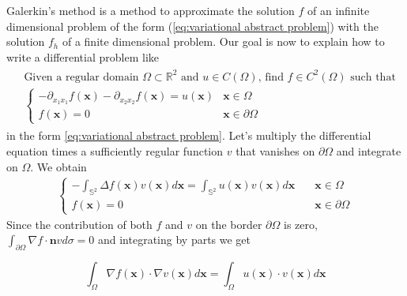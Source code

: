 Galerkin's method is a method to approximate the solution $f$ of an infinite dimensional problem of the form (\ref{eq:variational abstract problem}) with the solution $f_h$ of a finite dimensional problem. Our goal is now to explain how to write a differential problem like 
\begin{align}\label{eq:strong form}
\begin{split}
&\text{Given a regular domain }\Omega\subset\mathbb R^2\text{ and } u\in C(\Omega)\text{, find }f\in C^2(\Omega) \text{ such that}\\
&\begin{cases}
-\partial_{x_1x_1}f(\mathbf x) - \partial_{x_2x_2}f(\mathbf x) = u(\mathbf x) & \mathbf x \in \Omega\\
f(\mathbf x) =  0& \mathbf x \in \partial \Omega
\end{cases}
\end{split}
\end{align}
in the form \ref{eq:variational abstract problem}. Let's multiply the differential equation times a sufficiently regular function $v$ that vanishes on $\partial \Omega$ and integrate on $\Omega$. We obtain
\begin{align}
\begin{cases}
-\int_{\mathbb S^2}\Delta f(\mathbf x)v(\mathbf x)d\mathbf x =\int_{\mathbb S^2} u(\mathbf x)v(\mathbf x)d\mathbf x &\quad \mathbf x \in \Omega\\
f(\mathbf x) =  0&\quad \mathbf x \in \partial \Omega
\end{cases}	
\end{align}
 Since the contribution of both $f$ and $v$ on the border $\partial \Omega$ is zero, \\$\int_{\partial \Omega}\nabla f \cdot \mathbf nv d\sigma=0$ and integrating by parts we get

\begin{equation}\label{eq:int by parts}
	\int_\Omega \nabla f(\mathbf x)\cdot\nabla v(\mathbf x) d\mathbf x = \int_\Omega  u(\mathbf x)\cdot v(\mathbf x)d\mathbf x
\end{equation}

